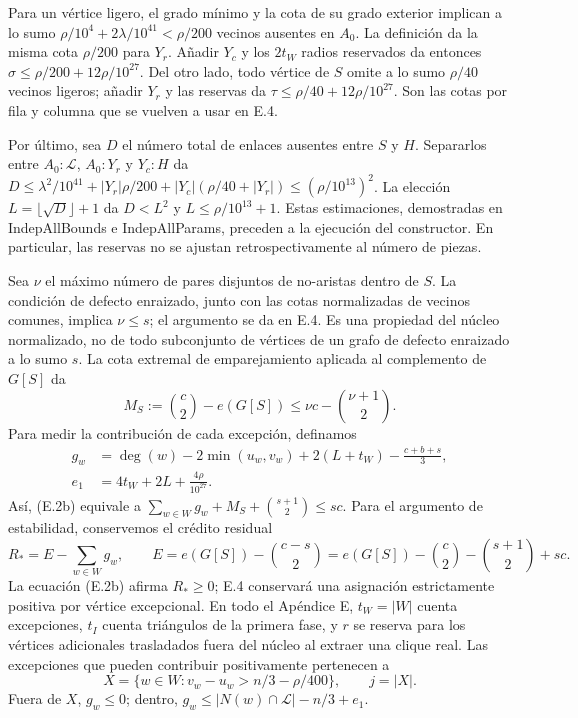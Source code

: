 \documentclass[spanish,11pt,a4paper]{article}
\begin{document}
Para un vértice ligero, el grado mínimo y la cota de su grado exterior implican a lo sumo \(\rho/10^4+2\lambda/10^{41}<\rho/200\) vecinos ausentes en \(A_0\). La definición da la misma cota \(\rho/200\) para \(Y_r\). Añadir \(Y_c\) y los \(2t_W\) radios reservados da entonces \(\sigma\le\rho/200+12\rho/10^{27}\). Del otro lado, todo vértice de \(S\) omite a lo sumo \(\rho/40\) vecinos ligeros; añadir \(Y_r\) y las reservas da \(\tau\le\rho/40+12\rho/10^{27}\). Son las cotas por fila y columna que se vuelven a usar en E.4.

Por último, sea \(D\) el número total de enlaces ausentes entre \(S\) y \(H\). Separarlos entre \(A_0\!:\!\mathcal L\), \(A_0\!:\!Y_r\) y \(Y_c\!:\!H\) da \(D\le\lambda^2/10^{41}+|Y_r|\rho/200+|Y_c|(\rho/40+|Y_r|)\le(\rho/10^{13})^2\). La elección \(L=\lfloor\sqrt D\rfloor+1\) da \(D<L^2\) y \(L\le\rho/10^{13}+1\). Estas estimaciones, demostradas en {\ttfamily\small IndepAllBoun\discretionary{\hbox{\ensuremath{\hookrightarrow}}}{}{}ds} e {\ttfamily\small IndepAllPara\discretionary{\hbox{\ensuremath{\hookrightarrow}}}{}{}ms}, preceden a la ejecución del constructor. En particular, las reservas no se ajustan retrospectivamente al número de piezas.

Sea \(\nu\) el máximo número de pares disjuntos de no-aristas dentro de \(S\). La condición de defecto enraizado, junto con las cotas normalizadas de vecinos comunes, implica \(\nu\le s\); el argumento se da en E.4. Es una propiedad del núcleo normalizado, no de todo subconjunto de vértices de un grafo de defecto enraizado a lo sumo \(s\). La cota extremal de emparejamiento aplicada al complemento de \(G[S]\) da \[
M_S:=\binom c2-e(G[S])\le \nu c-\binom{\nu+1}2.
\] Para medir la contribución de cada excepción, definamos \[
\begin{split}
g_w&=\deg(w)-2\min(u_w,v_w)+2(L+t_W)-\frac{c+b+s}{3},\\
e_1&=4t_W+2L+\frac{4\rho}{10^{27}}.
\end{split}
\] Así, (E.2b) equivale a \(\sum_{w\in W}g_w+M_S+\binom{s+1}2\le sc\). Para el argumento de estabilidad, conservemos el crédito residual \[
R_*=E-\sum_{w\in W}g_w,\qquad
E=e(G[S])-\binom{c-s}{2}
  =e(G[S])-\binom c2-\binom{s+1}2+sc.
\] La ecuación (E.2b) afirma \(R_*\ge0\); E.4 conservará una asignación estrictamente positiva por vértice excepcional. En todo el Apéndice E, \(t_W=|W|\) cuenta excepciones, \(t_I\) cuenta triángulos de la primera fase, y \(r\) se reserva para los vértices adicionales trasladados fuera del núcleo al extraer una clique real. Las excepciones que pueden contribuir positivamente pertenecen a \[
X=\{w\in W:v_w-u_w>n/3-\rho/400\},\qquad j=|X|.
\] Fuera de \(X\), \(g_w\le0\); dentro, \(g_w\le |N(w)\cap\mathcal L|-n/3+e_1\).
\end{document}
